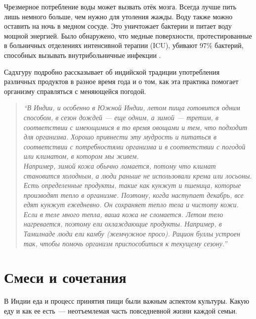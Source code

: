 \begin{DidYouKnow}
Чрезмерное потребление воды может вызвать отёк мозга. Всегда лучше пить лишь немного больше, чем нужно для утоления жажды. Воду также можно оставить на ночь в медном сосуде. Это уничтожает бактерии и питает воду мощной энергией. Было обнаружено, что медные поверхности, протестированные в больничных отделениях интенсивной терапии (ICU), убивают 97\% бактерий, способных вызывать внутрибольничные инфекции \cite{CopperBacteria}.
\end{DidYouKnow}

Садхгуру подробно рассказывает об индийской традиции употребления различных продуктов в разное время года и о том, как эта практика помогает организму справляться с меняющейся погодой.

\begin{quote}
\textit{``В Индии, и особенно в Южной Индии, летом пища готовится одним способом, в сезон дождей --- еще одним, а зимой --- третим, в соответствии с имеющимися в то время овощами и тем, что подходит для организма. Хорошо привнести эту мудрость и питаться в соответствии с потребностями организма и в соответствии с погодой или климатом, в котором мы живем.
\\[3pt]
Например, зимой кожа обычно ломается, потому что климат становится холодным, а люди раньше не использовали крема или лосьоны. Есть определенные продукты, такие как кунжут и пшеница, которые производят тепло в организме. Поэтому, когда наступает декабрь, все едят кунжут ежедневно. Он сохраняет тепло тела и чистоту кожи. Если в теле много тепла, ваша кожа не сломается. Летом тело нагревается, поэтому ели охлаждающие продукты. Например, в Тамилнаде люди ели камбу (жемчужное просо). Рацион буллы устроен так, чтобы помочь организм приспособиться к текущему сезону.''
\\[5pt]
}
\end{quote}


\section{Смеси и сочетания}
В Индии еда и процесс принятия пищи были важным аспектом культуры. Какую еду и как ее есть~--- неотъемлемая часть повседневной жизни каждой семьи.


